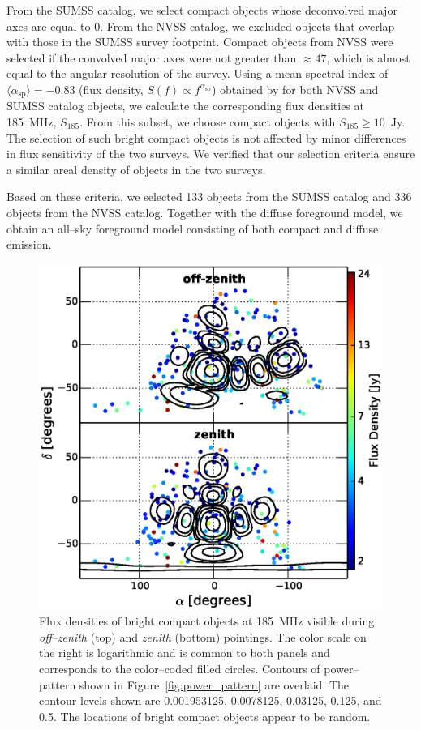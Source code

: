 \documentclass[preprint2,iop,numberedappendix]{emulateapj}
\begin{document}
From the SUMSS catalog, we select compact objects whose deconvolved major axes are equal to 0\arcsec. From the NVSS catalog, we excluded objects that overlap with those in the SUMSS survey footprint. Compact objects from NVSS were selected if the convolved major axes were not greater than $\approx 47$\arcsec, which is almost equal to the angular resolution of the survey. Using a mean spectral index of $\langle\alpha_\textrm{sp}\rangle=-0.83$ (flux density, $S(f)\propto f^{\alpha_\textrm{sp}}$) obtained by \citet{mau03} for both NVSS and SUMSS catalog objects, we calculate the corresponding flux densities at 185~MHz, $S_{185}$. From this subset, we choose compact objects with $S_{185}\geq 10$~Jy. The selection of such bright compact objects is not affected by minor differences in flux sensitivity of the two surveys. We verified that our selection criteria ensure a similar areal density of objects in the two surveys. 

Based on these criteria, we selected 133 objects from the SUMSS catalog and 336 objects from the NVSS catalog. Together with the diffuse foreground model, we obtain an all--sky foreground model consisting of both compact and diffuse emission.

\begin{figure}[htb]
\centering
\includegraphics[width=\linewidth]{figures/v1_0/csm.eps}
\caption{Flux densities of bright compact objects at 185~MHz visible during {\it off--zenith} (top) and {\it zenith} (bottom) pointings. The color scale on the right is logarithmic and is common to both panels and corresponds to the color--coded filled circles. Contours of power--pattern shown in Figure~\ref{fig:power_pattern} are overlaid. The contour levels shown are 0.001953125, 0.0078125, 0.03125, 0.125, and 0.5. The locations of bright compact objects appear to be random.\label{fig:CSM}}
\end{figure}
\end{document}
